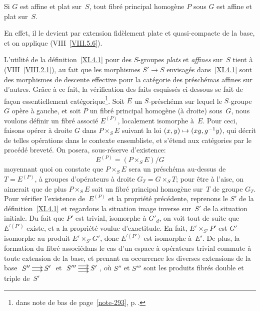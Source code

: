 \begin{corollaire}
\label{XI.4.3}
Si $G$ est affine et plat sur~$S$, tout fibr\'e principal
homog\`ene $P$ sous $G$ est affine et plat sur~$S$.
\end{corollaire}

En effet, il le devient par extension fid\`element plate et
quasi-compacte de la base, et on applique (VIII~\ref{VIII.5.6}).

L'utilit\'e de la d\'efinition~\ref{XI.4.1} pour des $S$-groupes
\emph{plats} et \emph{affines} sur~$S$ tient \`a
(VIII~\ref{VIII.2.1}), \ie au fait que les morphismes $S'\to S$
envisag\'es dans~\ref{XI.4.1} sont des morphismes de descente
effective pour la cat\'egorie des pr\'esch\'emas affines sur
d'autres. Gr\^ace \`a ce fait, la v\'erification des faits
esquiss\'es ci-dessous se fait de fa\c con essentiellement
\og cat\'egorique\fg\footnote{\Cf \loccit dans note de bas de
page~\eqref{note-293}, p.\,\pageref{note-293}.}. Soit $E$ un $S$-pr\'esch\'ema sur lequel le
$S$-groupe $G$ op\`ere \`a gauche, et soit $P$ un fibr\'e
principal homog\`ene (\`a droite) sous~$G$, nous voulons
d\'efinir un fibr\'e associ\'e $E^{(P)}$, \og localement\fg
isomorphe \`a~$E$. Pour ceci, faisons op\'erer
\`a droite $G$ dans $P\times_S E$ suivant la loi $(x,y)\mto
(xg,g^{-1}y)$, qui d\'ecrit de telles op\'erations dans le
contexte ensembliste, et s'\'etend aux cat\'egories par le
proc\'ed\'e brevet\'e. On posera, sous-r\'eserve d'existence:
$$
E^{(P)}=(P\times_S E)/G
$$
moyennant quoi on constate que $P\times_S E$ sera un pr\'esch\'ema
au-dessus de~$T=E^{(P)}$, \`a groupes d'op\'erateurs \`a droite
$G_T=G\times_S T$; pour \^etre \`a l'aise, on aimerait que de plus
$P\times_S E$ soit un fibr\'e principal homog\`ene sur~$T$ de
groupe $G_T$. Pour v\'erifier l'existence de~$E^{(P)}$ et la
propri\'et\'e pr\'ec\'edente, reprenons le $S'$ de la
d\'efinition~\ref{XI.4.1} et regardons la situation image inverse
sur~$S'$ de la situation initiale. Du fait que $P'$ est
trivial,
\ie isomorphe \`a $G'_d$, on voit tout de suite que $E^{\prime(P')}$
existe, et a la propri\'et\'e voulue d'exactitude. En fait,
$E'\times_{S'} P'$ est $G'$-isomorphe au produit $E'\times_{S'} G'$,
donc $E^{\prime(P')}$ est isomorphe \`a~$E'$. De plus, la formation du
\og fibr\'e associ\'e\fg dans le cas d'un espace \`a op\'erateurs
trivial commute \`a toute extension de la base, et prenant en
occurrence les diverses extensions de la base
$\xymatrix@C=.5cm{{S''}\ar@<2pt>[r]\ar@<-2pt>[r]&{S'}}$
et
$\xymatrix@C=.5cm{{S'''}\ar@<4pt>[r]\ar@<0pt>[r]\ar@<-4pt>[r]&{S'}}$, o\`u
$S''$ et $S'''$ sont les produits fibr\'es double et triple de~$S'$
